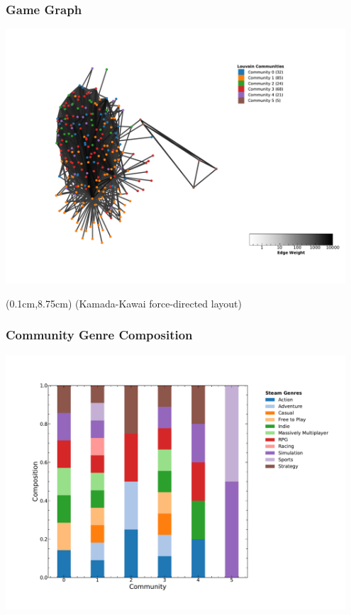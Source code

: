 \documentclass[18pt,xcolor=table]{beamer} \usefonttheme[onlymath]{serif}
\begin{document}
\begin{frame}
  \frametitle{Game Graph}
  \centering
  \includegraphics[width=0.95\textwidth,trim={5cm 3cm 0.5cm 3.7cm},clip]{../output/graph.pdf} %
  \begin{textblock*}{6cm}(0.1cm,8.75cm)
{\small (Kamada-Kawai force-directed layout)}
  \end{textblock*}
\end{frame}

\begin{frame}
  \frametitle{Community Genre Composition}
  \centering
  \includegraphics[width=0.95\textwidth]{../output/genre_comps.pdf}
\end{frame}
\end{document}
